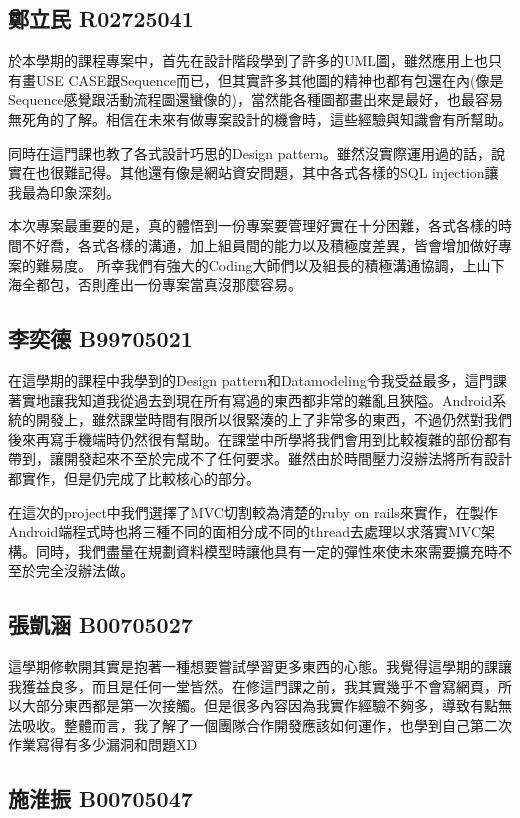 \subsection*{鄭立民 R02725041}

於本學期的課程專案中，首先在設計階段學到了許多的UML圖，雖然應用上也只有畫USE CASE跟Sequence而已，但其實許多其他圖的精神也都有包還在內(像是Sequence感覺跟活動流程圖還蠻像的)，當然能各種圖都畫出來是最好，也最容易無死角的了解。相信在未來有做專案設計的機會時，這些經驗與知識會有所幫助。

同時在這門課也教了各式設計巧思的Design pattern。雖然沒實際運用過的話，說實在也很難記得。其他還有像是網站資安問題，其中各式各樣的SQL injection讓我最為印象深刻。

本次專案最重要的是，真的體悟到一份專案要管理好實在十分困難，各式各樣的時間不好喬，各式各樣的溝通，加上組員間的能力以及積極度差異，皆會增加做好專案的難易度。
所幸我們有強大的Coding大師們以及組長的積極溝通協調，上山下海全都包，否則產出一份專案當真沒那麼容易。

\subsection*{李奕德 B99705021}

在這學期的課程中我學到的Design pattern和Datamodeling令我受益最多，這門課著實地讓我知道我從過去到現在所有寫過的東西都非常的雜亂且狹隘。Android系統的開發上，雖然課堂時間有限所以很緊湊的上了非常多的東西，不過仍然對我們後來再寫手機端時仍然很有幫助。在課堂中所學將我們會用到比較複雜的部份都有帶到，讓開發起來不至於完成不了任何要求。雖然由於時間壓力沒辦法將所有設計都實作，但是仍完成了比較核心的部分。

在這次的project中我們選擇了MVC切割較為清楚的ruby on rails來實作，在製作Android端程式時也將三種不同的面相分成不同的thread去處理以求落實MVC架構。同時，我們盡量在規劃資料模型時讓他具有一定的彈性來使未來需要擴充時不至於完全沒辦法做。

\subsection*{張凱涵 B00705027}

這學期修軟開其實是抱著一種想要嘗試學習更多東西的心態。我覺得這學期的課讓我獲益良多，而且是任何一堂皆然。在修這門課之前，我其實幾乎不會寫網頁，所以大部分東西都是第一次接觸。但是很多內容因為我實作經驗不夠多，導致有點無法吸收。整體而言，我了解了一個團隊合作開發應該如何運作，也學到自己第二次作業寫得有多少漏洞和問題XD

\subsection*{施淮振 B00705047}

